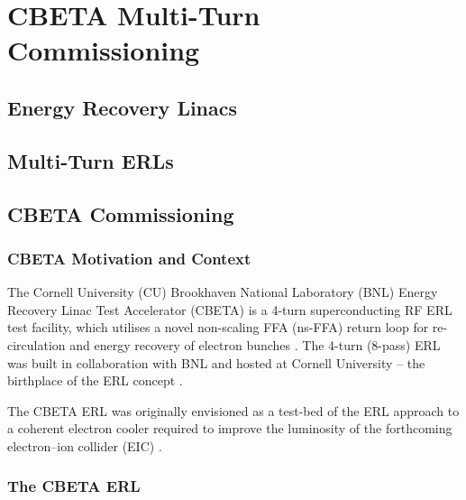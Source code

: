 \documentclass[../main.tex]{subfiles}
\begin{document}
\chapter{CBETA Multi-Turn Commissioning}
\label{CBETA_Multi-Pass_Commissioning} %

\section{Energy Recovery Linacs}

\section{Multi-Turn ERLs}

\section{CBETA Commissioning}
\subsection{CBETA Motivation and Context}
The Cornell University (CU) Brookhaven National Laboratory (BNL) Energy Recovery Linac Test Accelerator (CBETA) is a 4-turn superconducting RF ERL test facility, which utilises a novel non-scaling FFA (ns-FFA) return loop for re-circulation and energy recovery of electron bunches \cite{hoffstaetter2017cbeta,bartnik2020cbeta}. The 4-turn (8-pass) ERL was built in collaboration with BNL and hosted at Cornell University -- the birthplace of the ERL concept \cite{tigner1965possible}. 

The CBETA ERL was originally envisioned as a test-bed of the ERL approach to a coherent electron cooler \cite{derbenev1991coherent,litvinenko2009coherent} required to improve the luminosity of the forthcoming electron--ion collider (EIC) \cite{willeke2021electron}.


\subsection{The CBETA ERL}
\end{document}

